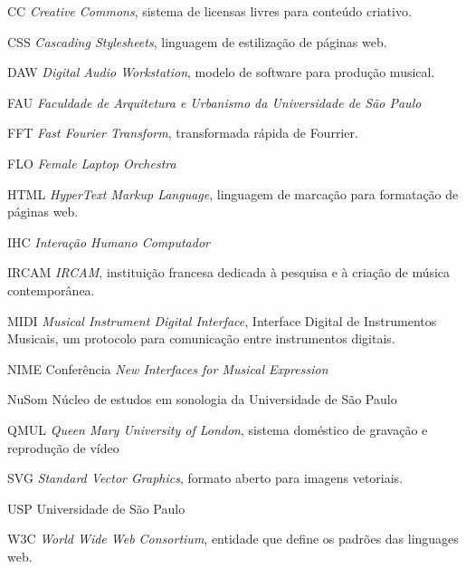 \documentclass[
	12pt,				%
	openright,			%
	twoside,			%
	a4paper,			%
	english,			%
	french,				%
	spanish,			%
	brazil				%
	]{abntex2}
\begin{document}

\begin{siglas}
\item[CC] \textit{Creative Commons}, sistema de licensas livres para conteúdo criativo. 

\item[CSS] \textit{Cascading Stylesheets}, linguagem de estilização de páginas web.

\item[DAW] \textit{Digital Audio Workstation}, modelo de software para produção musical.
\item[FAU] \textit{Faculdade de Arquitetura e Urbanismo da Universidade de São Paulo}

\item[FFT] \textit{Fast Fourier Transform}, transformada rápida de Fourrier.
\item[FLO] \textit{Female Laptop Orchestra}


\item[HTML] \textit{HyperText Markup Language}, linguagem de marcação para formatação de páginas web.
\item[IHC] \textit{Interação Humano Computador}

\item[IRCAM] \textit{IRCAM}, instituição francesa dedicada à pesquisa e à criação de música contemporânea.
\item[MIDI] \textit{Musical Instrument Digital Interface}, Interface Digital de Instrumentos Musicais, um protocolo para comunicação entre instrumentos digitais.
\item[NIME] Conferência \textit{New Interfaces for Musical Expression}
\item[NuSom] Núcleo de estudos em sonologia da Universidade de São Paulo
\item[QMUL] \textit{Queen Mary University of London}, sistema doméstico de gravação e reprodução de vídeo
\item[SVG] \textit{Standard Vector Graphics}, formato aberto para imagens vetoriais.
\item[USP] Universidade de São Paulo
\item[W3C] \textit{World Wide Web Consortium}, entidade que define os padrões das linguages web.



\end{siglas}
\end{document}
